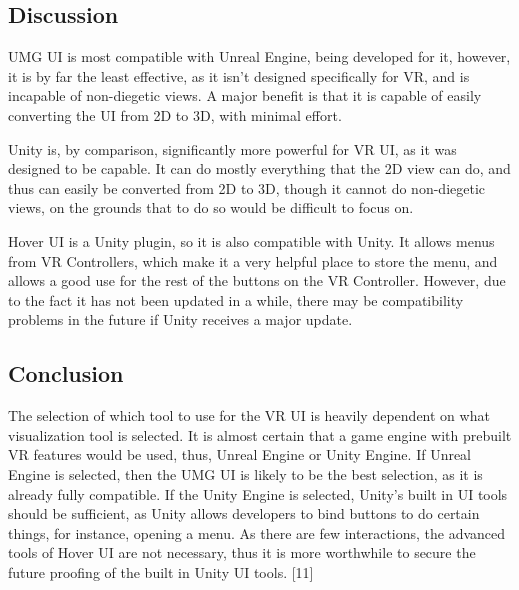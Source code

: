 \documentclass[onecolumn, draftclsnofoot,10pt, compsoc]{IEEEtran}
\begin{document}
\subsection{Discussion}
UMG UI is most compatible with Unreal Engine, being developed for it, however, it is by far the least effective, as it isn't designed specifically for VR, and is incapable of non-diegetic views. A major benefit is that it is capable of easily converting the UI from 2D to 3D, with minimal effort.

Unity is, by comparison, significantly more powerful for VR UI, as it was designed to be capable. It can do mostly everything that the 2D view can do, and thus can easily be converted from 2D to 3D, though it cannot do non-diegetic views, on the grounds that to do so would be difficult to focus on.

Hover UI is a Unity plugin, so it is also compatible with Unity. It allows menus from VR Controllers, which make it a very helpful place to store the menu, and allows a good use for the rest of the buttons on the VR Controller. However, due to the fact it has not been updated in a while, there may be compatibility problems in the future if Unity receives a major update.

\subsection{Conclusion}
The selection of which tool to use for the VR UI is heavily dependent on what visualization tool is selected. It is almost certain that a game engine with prebuilt VR features would be used, thus, Unreal Engine or Unity Engine. If Unreal Engine is selected, then the UMG UI is likely to be the best selection, as it is already fully compatible.
If the Unity Engine is selected, Unity's built in UI tools should be sufficient, as Unity allows developers to bind buttons to do certain things, for instance, opening a menu. As there are few interactions, the advanced tools of Hover UI are not necessary, thus it is more worthwhile to secure the future proofing of the built in Unity UI tools. [11]

\newpage
\end{document}
